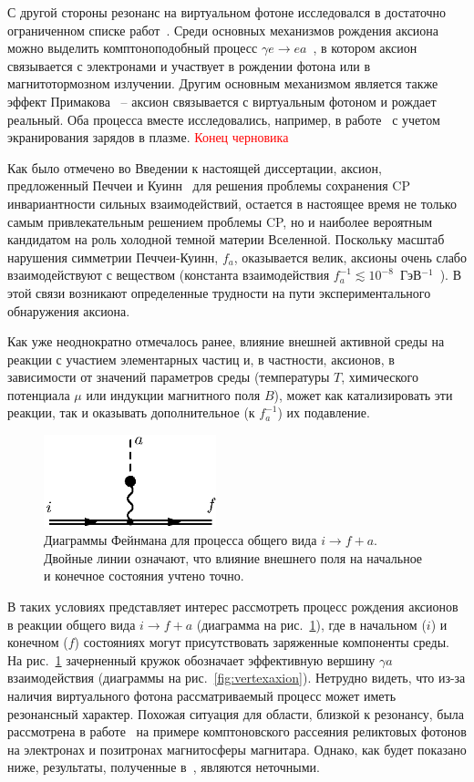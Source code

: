 С другой стороны резонанс на виртуальном фотоне исследовался в достаточно ограниченном списке работ~\cite{Skobelev:2000,Skobelev:2007,MikhRumShk:09}. Среди основных механизмов рождения аксиона можно выделить комптоноподобный процесс $\gamma e \to e a$~\cite{Skobelev:2000}, в котором аксион связывается с электронами и участвует в рождении фотона или в магнитотормозном излучении. Другим основным механизмом является также эффект Примакова~\cite{Primakoff:1951} -- аксион связывается с виртуальным фотоном и рождает реальный. Оба процесса вместе исследовались, например, в работе~\cite{Raffelt:1996} с учетом экранирования зарядов в плазме.
\textcolor{red}{Конец черновика}

Как было отмечено во Введении к настоящей диссертации, аксион, предложенный Печчеи  и Куинн~\cite{Quinn:1977} для 
решения проблемы сохранения CP инвариантности 
сильных взаимодействий, остается в настоящее время не только самым привлекательным 
решением проблемы CP, но и наиболее вероятным кандидатом на роль холодной темной
материи Вселенной. Поскольку масштаб нарушения симметрии Печчеи-Куинн, $f_a$,
оказывается велик, аксионы очень слабо взаимодействуют с веществом
(константа взаимодействия $f_a^{-1} \lesssim 10^{-8}$\, ГэВ$^{-1}$~\cite{Raffelt:1996}). 
В этой связи возникают определенные трудности
на пути экспериментального обнаружения аксиона.

Как уже неоднократно отмечалось ранее, влияние внешней активной среды на реакции с 
участием элементарных частиц и, в частности,  аксионов,
в зависимости от значений параметров среды (температуры  $T$, 
химического потенциала  $\mu$ или индукции магнитного поля  $B$), может
 как катализировать эти реакции, так и оказывать дополнительное (к $f_a^{-1}$) 
их подавление.  

%
\begin{figure}
\centerline{\includegraphics[width=5cm]{fig5_1.eps}}
\caption{Диаграммы Фейнмана для процесса общего вида $i \to 
f+a$. Двойные линии означают, что влияние внешнего поля на начальное и 
конечное состояния учтено точно.}
\label{fig:Diagaxion}
\end{figure}


В таких условиях представляет интерес рассмотреть процесс рождения аксионов   в 
реакции общего вида $i \to f + a$ (диаграмма на рис.~\ref{fig:Diagaxion}), 
где в начальном ($i$) и конечном ($f$) состояниях могут присутствовать 
заряженные компоненты среды. 
На рис.~\ref{fig:Diagaxion} зачерненный
кружок обозначает эффективную вершину $\gamma a$ взаимодействия
(диаграммы на рис.~\ref{fig:vertexaxion}). Нетрудно видеть, что из-за наличия виртуального 
фотона рассматриваемый процесс может иметь резонансный характер. Похожая ситуация
для области, близкой к резонансу, была рассмотрена в работе~\cite{Skobelev:2007} 
на примере
комптоновского рассеяния реликтовых фотонов на электронах и позитронах магнитосферы
магнитара. Однако, как будет показано ниже,  результаты, полученные 
в~\cite{Skobelev:2007}, являются неточными. 

